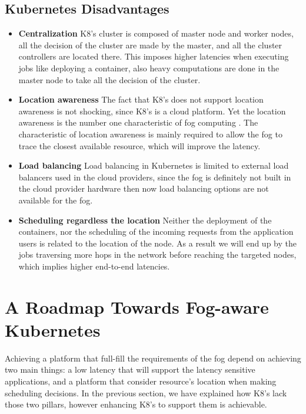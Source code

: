 \documentclass[letterpaper,twocolumn,10pt]{article}
\begin{document}
\subsection{Kubernetes Disadvantages}

\begin{itemize}
\item {\bf Centralization}
K8's cluster is composed of master node and worker nodes, all the decision of the cluster are made by the master, and all the cluster controllers are located there. This imposes higher latencies when executing jobs like deploying a container, also heavy computations are done in the master node to take all the decision of the cluster.  

\item{\bf Location awareness}
The fact that K8's does not support location awareness is not shocking, since K8's is a cloud platform. Yet the location awareness is the number one characteristic of fog computing \cite{Bonomi:2012:FCR:2342509.2342513}. 
The characteristic of location awareness is mainly required to allow the fog to trace the closest available resource, which will improve the latency.

\item {\bf Load balancing}
Load balancing in Kubernetes is limited to external load balancers used in the cloud providers, since the fog is definitely not built in the cloud provider hardware then now load balancing options are not available for the fog.

\item {\bf Scheduling regardless the location}
Neither the deployment of the containers, nor the scheduling of the incoming requests from the application users  is related to the location of the node. As a result we will end up by the jobs traversing more hops in the network before reaching the targeted nodes, which implies higher end-to-end latencies.


\end{itemize}

\section{A Roadmap Towards Fog-aware Kubernetes}\label{sec:road}

Achieving a platform that full-fill the requirements of the fog depend on achieving two main things: a low latency that will support the latency sensitive applications, and a platform that consider resource's location when making scheduling decisions. In the previous section, we have explained how K8's lack those two pillars, however enhancing K8's to support them is achievable.
\end{document}
